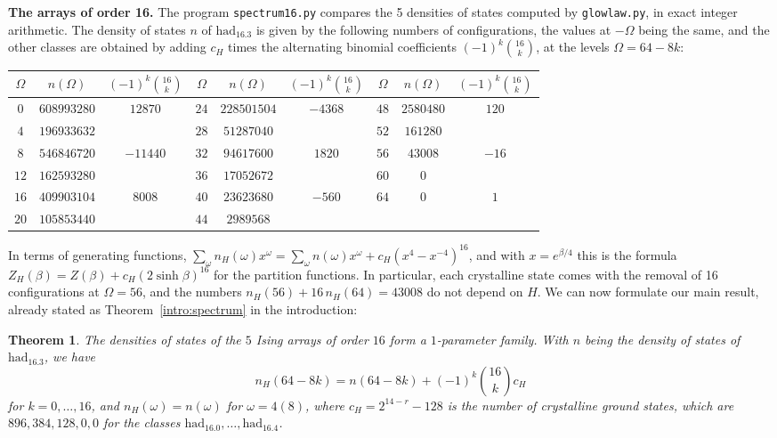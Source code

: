 \documentclass[11pt,a4paper]{article}
\newtheorem{thm}{Theorem}[section]
\theoremstyle{remark}
\begin{document}
\medskip

\noindent\textbf{The arrays of order 16.}
The program \texttt{spectrum16.py} compares the 5 densities of states computed by \texttt{glowlaw.py}, in exact integer arithmetic. The density of states $n$ of $\mathrm{had}_{16.3}$ is given by the following numbers of configurations, the values at $-\Omega$ being the same, and the other classes are obtained by adding $c_H$ times the alternating binomial coefficients $(-1)^k\binom{16}{k}$, at the levels $\Omega=64-8k$:

\medskip

\begin{center}
\begin{tabular}{|c|c|c||c|c|c||c|c|c|}
\hline
$\Omega$ & $n(\Omega)$ & $(-1)^k\binom{16}{k}$ & $\Omega$ & $n(\Omega)$ & $(-1)^k\binom{16}{k}$ & $\Omega$ & $n(\Omega)$ & $(-1)^k\binom{16}{k}$\\
\hline
$0$ & $608993280$ & $12870$ & $24$ & $228501504$ & $-4368$ & $48$ & $2580480$ & $120$\\
$4$ & $196933632$ &  & $28$ & $51287040$ &  & $52$ & $161280$ & \\
$8$ & $546846720$ & $-11440$ & $32$ & $94617600$ & $1820$ & $56$ & $43008$ & $-16$\\
$12$ & $162593280$ &  & $36$ & $17052672$ &  & $60$ & $0$ & \\
$16$ & $409903104$ & $8008$ & $40$ & $23623680$ & $-560$ & $64$ & $0$ & $1$\\
$20$ & $105853440$ &  & $44$ & $2989568$ &  &  &  & \\
\hline
\end{tabular}
\end{center}

\medskip

In terms of generating functions, $\sum_\omega n_H(\omega)x^\omega=\sum_\omega n(\omega)x^\omega+c_H(x^4-x^{-4})^{16}$, and with $x=e^{\beta/4}$ this is the formula $Z_H(\beta)=Z(\beta)+c_H(2\sinh\beta)^{16}$ for the partition functions. In particular, each crystalline state comes with the removal of 16 configurations at $\Omega=56$, and the numbers $n_H(56)+16\,n_H(64)=43008$ do not depend on $H$. We can now formulate our main result, already stated as Theorem~\ref{intro:spectrum} in the introduction:

\begin{samepage}
\begin{thm}\label{thm:spectrum}
The densities of states of the $5$ Ising arrays of order $16$ form a $1$-parameter family. With $n$ being the density of states of $\mathrm{had}_{16.3}$, we have
\[
 n_H(64-8k)=n(64-8k)+(-1)^k\binom{16}{k}c_H
\]
for $k=0,\ldots,16$, and $n_H(\omega)=n(\omega)$ for $\omega=4(8)$, where $c_H=2^{14-r}-128$ is the number of crystalline ground states, which are $896,384,128,0,0$ for the classes $\mathrm{had}_{16.0},\ldots,\mathrm{had}_{16.4}$.
\end{thm}
\end{samepage}
\end{document}
